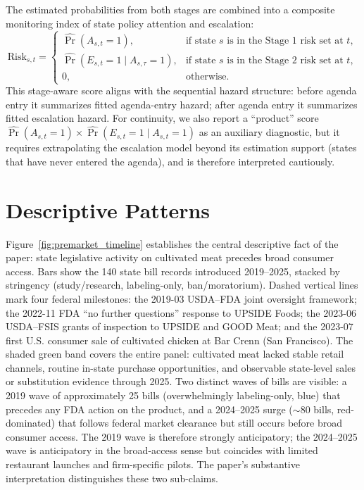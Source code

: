 \documentclass[12pt]{article}
\begin{document}
The estimated probabilities from both stages are combined into a composite monitoring index of state policy attention and escalation:
\begin{equation}
    \text{Risk}_{s,t} =
    \begin{cases}
    \hat{\Pr}(A_{s,t}=1), & \text{if state } s \text{ is in the Stage 1 risk set at } t,\\
    \hat{\Pr}(E_{s,t}=1\mid A_{s,\tau}=1), & \text{if state } s \text{ is in the Stage 2 risk set at } t,\\
    0, & \text{otherwise.}
    \end{cases}
    \label{eq:risk}
\end{equation}
This stage-aware score aligns with the sequential hazard structure: before agenda entry it summarizes fitted agenda-entry hazard; after agenda entry it summarizes fitted escalation hazard.  For continuity, we also report a ``product'' score $\hat{\Pr}(A_{s,t}=1)\times\hat{\Pr}(E_{s,t}=1\mid A_{s,t}=1)$ as an auxiliary diagnostic, but it requires extrapolating the escalation model beyond its estimation support (states that have never entered the agenda), and is therefore interpreted cautiously.

\section{Descriptive Patterns}
\label{sec:descriptive}

Figure~\ref{fig:premarket_timeline} establishes the central descriptive fact of the paper: state legislative activity on cultivated meat precedes broad consumer access.  Bars show the 140 state bill records introduced 2019--2025, stacked by stringency (study/research, labeling-only, ban/moratorium).  Dashed vertical lines mark four federal milestones: the 2019-03 USDA--FDA joint oversight framework; the 2022-11 FDA ``no further questions'' response to UPSIDE Foods; the 2023-06 USDA--FSIS grants of inspection to UPSIDE and GOOD Meat; and the 2023-07 first U.S. consumer sale of cultivated chicken at Bar Crenn (San Francisco).  The shaded green band covers the entire panel: cultivated meat lacked stable retail channels, routine in-state purchase opportunities, and observable state-level sales or substitution evidence through 2025.  Two distinct waves of bills are visible: a 2019 wave of approximately 25 bills (overwhelmingly labeling-only, blue) that precedes any FDA action on the product, and a 2024--2025 surge ($\sim$80 bills, red-dominated) that follows federal market clearance but still occurs before broad consumer access.  The 2019 wave is therefore strongly anticipatory; the 2024--2025 wave is anticipatory in the broad-access sense but coincides with limited restaurant launches and firm-specific pilots.  The paper's substantive interpretation distinguishes these two sub-claims.
\end{document}
